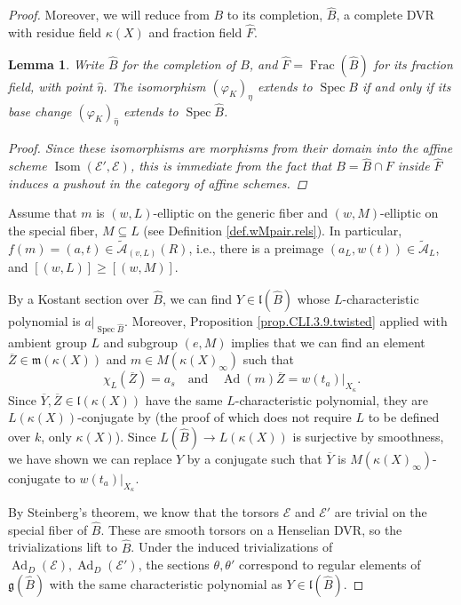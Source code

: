 \documentclass[openany]{amsbook}
\newtheorem{lemma}[theorem]{Lemma}
\theoremstyle{definition}
\theoremstyle{remark}
\numberwithin{equation}{section}
\newcommand{\cA}{\mathcal{A}}
\newcommand{\cE}{\mathcal{E}}
\newcommand{\ol}[1]{\overline{#1}}
\renewcommand{\phi}{\varphi}
\renewcommand{\-}{\operatorname{-}}
\newcommand{\Spec}{\operatorname{Spec}}
\newcommand{\on}[1]{\operatorname{#1}}
\newcommand{\Frac}{\on{Frac}}
\newcommand{\fm}{\mathfrak{m}}
\newcommand{\ctA}{\widetilde{\cA}}
\newcommand{\ctAt}[2]{\ctA_{(#1,#2)}}
\newcommand{\fl}{\mathfrak{l}}
\renewcommand{\fm}{\mathfrak{m}}
\renewcommand{\fg}{\mathfrak{g}}
\begin{document}
\begin{proof}
Moreover, we will reduce from $B$ to its completion, $\widehat{B}$, a complete DVR with residue field $\kappa(X)$ and fraction field $\widehat{F}$. 

\begin{lemma}\label{lem.complete.ext.sep.reduct}
    Write $\widehat{B}$ for the completion of $B$, and $\widehat{F} = \Frac(\widehat{B})$ for its fraction field, with point $\widehat{\eta}$. The isomorphism $(\phi_K)_\eta$ extends to $\Spec B$ if and only if its base change $(\phi_K)_{\widehat{\eta}}$ extends to $\Spec \widehat{B}$.
    \begin{proof}
        Since these isomorphisms are morphisms from their domain into the affine scheme $\on{Isom}(\cE', \cE)$, this is immediate from the fact that $B = \widehat{B} \cap F$ inside $\widehat{F}$ induces a pushout in the category of affine schemes.
    \end{proof}
\end{lemma}




Assume that $m$ is $(w,L)$-elliptic on the generic fiber and $(w,M)$-elliptic on the special fiber, $M \subseteq L$ (see Definition \ref{def.wMpair.rels}). In particular, $f(m) = (a,t) \in \ctAt{v}{L}(R)$, i.e., there is a preimage $(a_L, w(t)) \in \ctA_L$, and $[(w,L)] \ge [(w,M)]$.

By a Kostant section over $\widehat{B}$, we can find $Y \in \fl(\widehat{B})$ whose $L$-characteristic polynomial is $a|_{\Spec \widehat{B}}$. Moreover, Proposition \ref{prop.CLI.3.9.twisted} applied with ambient group $L$ and subgroup $(e, M)$ implies that we can find an element $\ol{Z} \in \fm(\kappa(X))$ and $m \in M(\kappa(X)_\infty)$ such that 
\[
    \chi_L(\ol{Z}) = a_s \quad \text{and} \quad \on{Ad}(m)\ol{Z} = w(t_a)|_{X_\kappa}.
\]
Since $\ol{Y}, \ol{Z} \in \fl(\kappa(X))$ have the same $L$-characteristic polynomial, they are $L(\kappa(X))$-conjugate by \cite[Lemme 3.8.1]{CLI} (the proof of which does not require $L$ to be defined over $k$, only $\kappa(X)$). Since $L(\widehat{B}) \to L(\kappa(X))$ is surjective by smoothness, we have shown we can replace $Y$ by a conjugate such that $\ol{Y}$ is $M(\kappa(X)_\infty)$-conjugate to $w(t_a)|_{X_\kappa}$. 

By Steinberg's theorem, we know that the torsors $\cE$ and $\cE'$ are trivial on the special fiber of $\widehat{B}$. These are smooth torsors on a Henselian DVR, so the trivializations lift to $\widehat{B}$. Under the induced trivializations of $\on{Ad}_D(\cE), \on{Ad}_D(\cE')$, the sections $\theta, \theta'$ correspond to regular elements of $\fg(\widehat{B})$ with the same characteristic polynomial as $Y \in \fl(\widehat{B})$. 


\end{proof}
\end{document}
